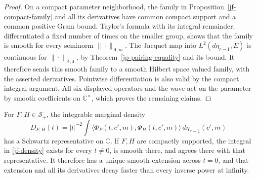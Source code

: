 \begin{proof}
On a compact parameter neighborhood, the family in
Proposition~\ref{jf-compact-family} and all its derivatives
have common compact support and a common positive Gram
bound.  Taylor's formula with its integral remainder,
differentiated a fixed number of times on the smaller group,
shows that the family is smooth for every seminorm
\(\|\cdot\|_{A,m}\).  The Jacquet map into
\(L^2(d\eta_{r-1},E)\) is continuous for
\(\|\cdot\|_{A,4}\), by
Theorem~\ref{jp-pairing-equality} and its bound.
It therefore sends this smooth family to a smooth Hilbert
space valued family, with the asserted derivatives.
Pointwise differentiation is also valid by the compact
integral argument.  All six displayed operators and the
wave act on the parameter by smooth coefficients on
\(\mathbb C^\times\), which proves the remaining claims.
\end{proof}

\begin{theorem}\label{jf-marginal-schwartz}
For \(F,H\in\mathscr S_+\), the integrable marginal density
\begin{equation}\label{jf-density}
 D_{F,H}(t)=|t|^{-2}
     \int\langle\Phi_F(t,c',m),\Phi_H(t,c',m)\rangle
                                    \,d\eta_{r-1}(c',m)
\end{equation}
has a Schwartz representative on \(\mathbb C\).
If \(F,H\) are compactly supported, the integral in
\eqref{jf-density} exists for every \(t\ne0\), is smooth
there, and agrees there with that representative.  It
therefore has a unique smooth extension across \(t=0\),
and that extension and all its derivatives decay faster
than every inverse power at infinity.
\end{theorem}

